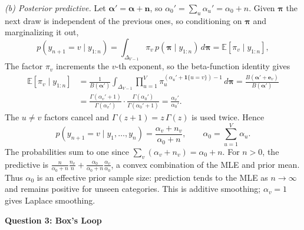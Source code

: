 \documentclass[12pt]{article}
\newcommand{\simplex}{\Delta_{V-1}}
\newcommand{\E}{\mathbb{E}}
\begin{document}
\textit{(b) Posterior predictive.} Let $\bm\alpha' = \bm\alpha + \bm n$, so
$\alpha_0' = \sum_u \alpha_u' = \alpha_0 + n$. Given $\bm\pi$ the next draw is independent
of the previous ones, so conditioning on $\bm\pi$ and marginalizing it out,
\[
  p(y_{n+1} = v \mid y_{1:n})
  = \int_{\simplex} \pi_v \, p(\bm\pi \mid y_{1:n}) \, d\bm\pi
  = \E[\pi_v \mid y_{1:n}],
\]
The factor $\pi_v$ increments the $v$-th exponent, so the beta-function identity gives
\[
  \begin{aligned}
  \E[\pi_v \mid y_{1:n}]
  &= \frac{1}{B(\bm\alpha')} \int_{\simplex} \prod_{u=1}^V \pi_u^{(\alpha_u' + \mathbf{1}\{u = v\}) - 1} \, d\bm\pi
  = \frac{B(\bm\alpha' + \bm e_v)}{B(\bm\alpha')}
  \\
  &= \frac{\Gamma(\alpha_v' + 1)}{\Gamma(\alpha_v')} \cdot \frac{\Gamma(\alpha_0')}{\Gamma(\alpha_0' + 1)}
  = \frac{\alpha_v'}{\alpha_0'}.
  \end{aligned}
\]
The $u \neq v$ factors cancel and $\Gamma(z+1) = z\,\Gamma(z)$ is used twice.
Hence
\[
  \boxed{\; p(y_{n+1} = v \mid y_1, \dots, y_n) = \frac{\alpha_v + n_v}{\alpha_0 + n},
  \qquad \alpha_0 = \sum_{u=1}^V \alpha_u. \;}
\]
The probabilities sum to one since $\sum_v (\alpha_v+n_v)=\alpha_0+n$.
For $n>0$, the predictive is
$\frac{n}{\alpha_0+n}\frac{n_v}{n}+\frac{\alpha_0}{\alpha_0+n}\frac{\alpha_v}{\alpha_0}$,
a convex combination of the MLE and prior mean. Thus $\alpha_0$ is an effective
prior sample size: prediction tends to the MLE as $n\to\infty$ and remains
positive for unseen categories. This is additive smoothing; $\alpha_v=1$ gives
Laplace smoothing.


\clearpage
\textbf{Question 3: Box's Loop}
\end{document}

